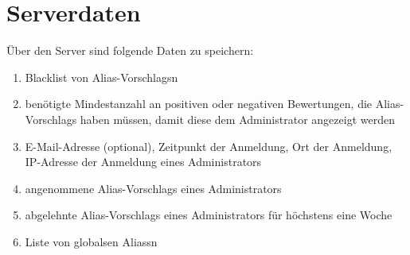 \section{Serverdaten}

Über den \Gls{Server} sind folgende Daten zu speichern:
\begin{enumerate}[label=\textbf{/D\arabic*0/}, align=left]
	\setcounter{enumi}{\value{user_data_end}}
	\item Blacklist von \Glspl{Alias-Vorschlag}n
	\item benötigte Mindestanzahl an positiven oder negativen Bewertungen, die \Glspl{Alias-Vorschlag} haben müssen, damit diese dem \Gls{Administrator} angezeigt werden
	\item E-Mail-Adresse (optional), Zeitpunkt der Anmeldung, Ort der Anmeldung, IP-Adresse der Anmeldung eines \Gls{Administrator}s
	\item angenommene \Glspl{Alias-Vorschlag} eines \Gls{Administrator}s
	\item abgelehnte \Glspl{Alias-Vorschlag} eines \Gls{Administrator}s für höchstens eine Woche
	\item Liste von \glspl{global}en \Glspl{Alias}n
\end{enumerate}